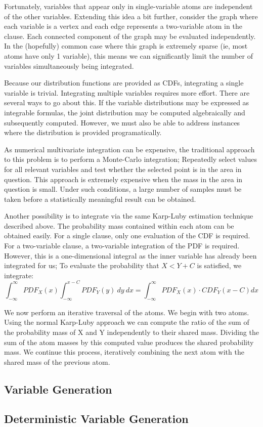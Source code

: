 Fortunately, variables that appear only in single-variable atoms are independent of the other variables.  Extending this idea a bit further, consider the graph where each variable is a vertex and each edge represents a two-variable atom in the clause.  Each connected component of the graph may be evaluated independently.  In the (hopefully) common case where this graph is extremely sparse (ie, most atoms have only 1 variable), this means we can significantly limit the number of variables simultaneously being integrated.

Because our distribution functions are provided as CDFs, integrating a single variable is trivial.  Integrating multiple variables requires more effort.  There are several ways to go about this.  If the variable distributions may be expressed as integrable formulas, the joint distribution may be computed algebraically and subsequently computed.  However, we must also be able to address instances where the distribution is provided programatically.

As numerical multivariate integration can be expensive, the traditional approach to this problem is to perform a Monte-Carlo integration; Repeatedly select values for all relevant variables and test whether the selected point is in the area in question.  This approach is extremely expensive when the mass in the area in question is small.  Under such conditions, a large number of samples must be taken before a statistically meaningful result can be obtained.  

Another possibility is to integrate via the same Karp-Luby estimation technique described above.  The probability mass contained within each atom can be obtained easily.  For a single clause, only one evaluation of the CDF is required.  For a two-variable clause, a two-variable integration of the PDF is required.  However, this is a one-dimensional integral as the inner variable has already been integrated for us; To evaluate the probability that $X < Y + C$ is satisfied, we integrate:
$$\int_{-\infty}^{\infty} PDF_X(x) \int_{-\infty}^{x-C} PDF_Y(y)\ dy\ dx = \int_{-\infty}^{\infty} PDF_X(x) \cdot CDF_Y(x-C) dx$$

We now perform an iterative traversal of the atoms.  We begin with two atoms.  Using the normal Karp-Luby approach we can compute the ratio of the sum of the probability mass of X and Y independently to their shared mass.  Dividing the sum of the atom masses by this computed value produces the shared probability mass.  We continue this process, iteratively combining the next atom with the shared mass of the previous atom.

\subsection{Variable Generation}


\subsection{Deterministic Variable Generation}



